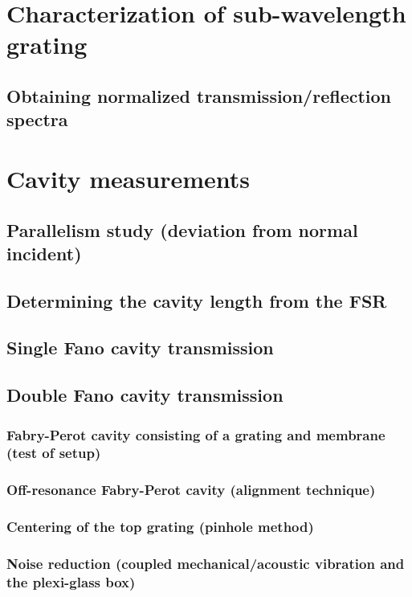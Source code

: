 \section{Characterization of sub-wavelength grating}

\subsection{Obtaining normalized transmission/reflection spectra}

\section{Cavity measurements}

\subsection{Parallelism study (deviation from normal incident)}

\subsection{Determining the cavity length from the FSR}

\subsection{Single Fano cavity transmission} 

\subsection{Double Fano cavity transmission}

\subsubsection{Fabry-Perot cavity consisting of a grating and membrane (test of setup)}

\subsubsection{Off-resonance Fabry-Perot cavity (alignment technique)}

\subsubsection{Centering of the top grating (pinhole method)}

\subsubsection{Noise reduction (coupled mechanical/acoustic vibration and the plexi-glass box)}